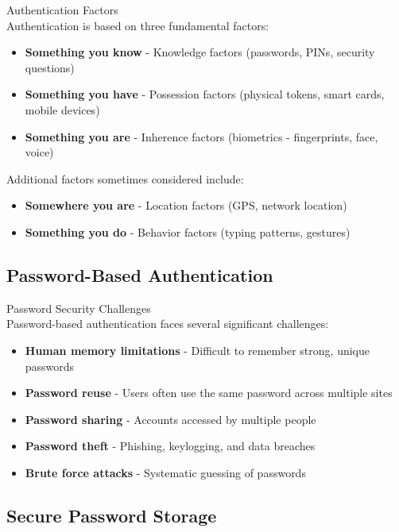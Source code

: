 \begin{definition}{Authentication Factors}\\
Authentication is based on three fundamental factors:
\begin{itemize}
    \item \textbf{Something you know} - Knowledge factors (passwords, PINs, security questions)
    \item \textbf{Something you have} - Possession factors (physical tokens, smart cards, mobile devices)
    \item \textbf{Something you are} - Inherence factors (biometrics - fingerprints, face, voice)
\end{itemize}
Additional factors sometimes considered include:
\begin{itemize}
    \item \textbf{Somewhere you are} - Location factors (GPS, network location)
    \item \textbf{Something you do} - Behavior factors (typing patterns, gestures)
\end{itemize}
\end{definition}

\subsection{Password-Based Authentication}

\begin{concept}{Password Security Challenges}\\
Password-based authentication faces several significant challenges:
\begin{itemize}
    \item \textbf{Human memory limitations} - Difficult to remember strong, unique passwords
    \item \textbf{Password reuse} - Users often use the same password across multiple sites
    \item \textbf{Password sharing} - Accounts accessed by multiple people
    \item \textbf{Password theft} - Phishing, keylogging, and data breaches
    \item \textbf{Brute force attacks} - Systematic guessing of passwords
\end{itemize}
\end{concept}


\subsection{Secure Password Storage}

